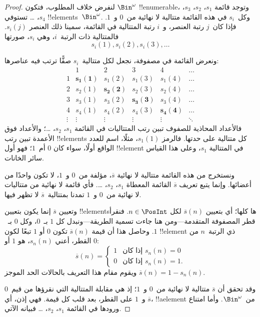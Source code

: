 \documentclass[../../../include/open-logic-section]{subfiles}
\begin{document}
\begin{proof}
لنفرض خلاف المطلوب، فتكون $\Bin^\omega$ !!{enumerable}، وتوجد قائمة $s_{1}$، $s_{2}$، $s_{3}$، $s_{4}$، \dots{} تستوفي !!{element}s~$\Bin^\omega$. وكل~$s_i$ في هذه القائمة متتالية لا نهائية من~$0$ و~$1$. فإذا كان~$j$ رتبة العنصر، و~$i$ رتبة المتتالية في القائمة، سمينا ذلك العنصر $s_i(j)$. فالمتتالية ذات الرتبة~$i$، وهي $s_i$، صورتها
\[
s_i(1), s_i(2), s_i(3), \dots
\]

ونعرض القائمة في مصفوفة، نجعل لكل متتالية~$s_i$ صفًّا ترتب فيه عناصرها:
\[
\begin{array}{c|c|c|c|c|c}
& 1 & 2 & 3 & 4 & \dots \\\hline
1 & \mathbf{s_{1}(1)} & s_{1}(2) & s_{1}(3) & s_1(4) & \dots \\\hline
2 & s_{2}(1)& \mathbf{s_{2}(2)} & s_2(3) & s_2(4) & \dots \\\hline
3 & s_{3}(1)& s_{3}(2) & \mathbf{s_3(3)} & s_3(4) & \dots \\\hline
4 & s_{4}(1)& s_{4}(2) & s_4(3) & \mathbf{s_4(4)} & \dots \\\hline
\vdots & \vdots & \vdots & \vdots & \vdots & \mathbf{\ddots}
\end{array}
\]
فالأعداد المحاذية للصفوف تبين رتب المتتاليات في القائمة $s_1$، $s_2$، \dots؛ والأعداد فوق الأعمدة تبين رتب !!{element}s كل متتالية على حدتها. فالرمز $s_{1}(1)$، مثلًا، اسم للعدد الواقع أولًا، سواء كان $0$ أم~$1$؛ فهو أول !!{element} في المتتالية $s_{1}$، وعلى هذا القياس سائر الخانات.

ونستخرج من هذه القائمة متتالية لا نهائية $\overline{s}$، مؤلفة من~$0$ و~$1$، لا تكون واحدًا من أعضائها. وإنما يتبع تعريف $\overline{s}$ القائمة المعطاة $s_1$، $s_2$، \dots. فأي قائمة لا نهائية من متتاليات لا نهائية من~$0$ و~$1$ تمدنا بمتتالية~$\overline{s}$ لا تظهر فيها.

وتعيين $\overline{s}$ إنما يكون بتعيين !!{element}sها كلها؛ أي بتعيين $\overline{s}(n)$ لكل $n \in \PosInt$. فنقرأ قطر المصفوفة المتقدمة---ومن هنا جاءت تسمية الطريقة---ونبدل كل $1$ بـ~$0$، وكل $0$ بـ~$1$. وحاصل هذا أن قيمة $\overline{s}(n)$ تكون $0$ أو $1$ تبعًا لكون !!{element} ذي الرتبة~$n$ من القطر، أعني $s_n(n)$، هو $1$ أو $0$:
\[
\overline{s}(n) =
\begin{cases}
1 & \text{إذا كان $s_{n}(n) = 0$}\\
0 & \text{إذا كان $s_{n}(n) = 1$}.
\end{cases}
\]
ويقوم مقام هذا التعريف بالحالات الحد الموجز
$\overline{s}(n) = 1 - s_n(n)$.

وقد تحقق أن $\overline{s}$ متتالية لا نهائية من~$0$ و~$1$؛ إذ هي مقابلة المتتالية التي نقرؤها من قيم~$0$ و~$1$ على القطر، بعد قلب كل قيمة. فهي إذن، أي $\overline{s}$، !!a{element} من~$\Bin^\omega$. وأما امتناع ورودها في القائمة $s_1$، $s_2$، \dots{} فبيانه الآتي.


\end{proof}
\end{document}
